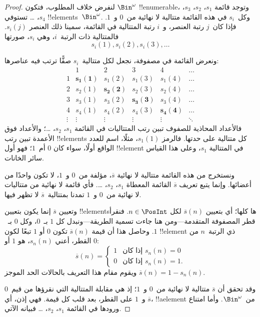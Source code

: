 \documentclass[../../../include/open-logic-section]{subfiles}
\begin{document}
\begin{proof}
لنفرض خلاف المطلوب، فتكون $\Bin^\omega$ !!{enumerable}، وتوجد قائمة $s_{1}$، $s_{2}$، $s_{3}$، $s_{4}$، \dots{} تستوفي !!{element}s~$\Bin^\omega$. وكل~$s_i$ في هذه القائمة متتالية لا نهائية من~$0$ و~$1$. فإذا كان~$j$ رتبة العنصر، و~$i$ رتبة المتتالية في القائمة، سمينا ذلك العنصر $s_i(j)$. فالمتتالية ذات الرتبة~$i$، وهي $s_i$، صورتها
\[
s_i(1), s_i(2), s_i(3), \dots
\]

ونعرض القائمة في مصفوفة، نجعل لكل متتالية~$s_i$ صفًّا ترتب فيه عناصرها:
\[
\begin{array}{c|c|c|c|c|c}
& 1 & 2 & 3 & 4 & \dots \\\hline
1 & \mathbf{s_{1}(1)} & s_{1}(2) & s_{1}(3) & s_1(4) & \dots \\\hline
2 & s_{2}(1)& \mathbf{s_{2}(2)} & s_2(3) & s_2(4) & \dots \\\hline
3 & s_{3}(1)& s_{3}(2) & \mathbf{s_3(3)} & s_3(4) & \dots \\\hline
4 & s_{4}(1)& s_{4}(2) & s_4(3) & \mathbf{s_4(4)} & \dots \\\hline
\vdots & \vdots & \vdots & \vdots & \vdots & \mathbf{\ddots}
\end{array}
\]
فالأعداد المحاذية للصفوف تبين رتب المتتاليات في القائمة $s_1$، $s_2$، \dots؛ والأعداد فوق الأعمدة تبين رتب !!{element}s كل متتالية على حدتها. فالرمز $s_{1}(1)$، مثلًا، اسم للعدد الواقع أولًا، سواء كان $0$ أم~$1$؛ فهو أول !!{element} في المتتالية $s_{1}$، وعلى هذا القياس سائر الخانات.

ونستخرج من هذه القائمة متتالية لا نهائية $\overline{s}$، مؤلفة من~$0$ و~$1$، لا تكون واحدًا من أعضائها. وإنما يتبع تعريف $\overline{s}$ القائمة المعطاة $s_1$، $s_2$، \dots. فأي قائمة لا نهائية من متتاليات لا نهائية من~$0$ و~$1$ تمدنا بمتتالية~$\overline{s}$ لا تظهر فيها.

وتعيين $\overline{s}$ إنما يكون بتعيين !!{element}sها كلها؛ أي بتعيين $\overline{s}(n)$ لكل $n \in \PosInt$. فنقرأ قطر المصفوفة المتقدمة---ومن هنا جاءت تسمية الطريقة---ونبدل كل $1$ بـ~$0$، وكل $0$ بـ~$1$. وحاصل هذا أن قيمة $\overline{s}(n)$ تكون $0$ أو $1$ تبعًا لكون !!{element} ذي الرتبة~$n$ من القطر، أعني $s_n(n)$، هو $1$ أو $0$:
\[
\overline{s}(n) =
\begin{cases}
1 & \text{إذا كان $s_{n}(n) = 0$}\\
0 & \text{إذا كان $s_{n}(n) = 1$}.
\end{cases}
\]
ويقوم مقام هذا التعريف بالحالات الحد الموجز
$\overline{s}(n) = 1 - s_n(n)$.

وقد تحقق أن $\overline{s}$ متتالية لا نهائية من~$0$ و~$1$؛ إذ هي مقابلة المتتالية التي نقرؤها من قيم~$0$ و~$1$ على القطر، بعد قلب كل قيمة. فهي إذن، أي $\overline{s}$، !!a{element} من~$\Bin^\omega$. وأما امتناع ورودها في القائمة $s_1$، $s_2$، \dots{} فبيانه الآتي.


\end{proof}
\end{document}
